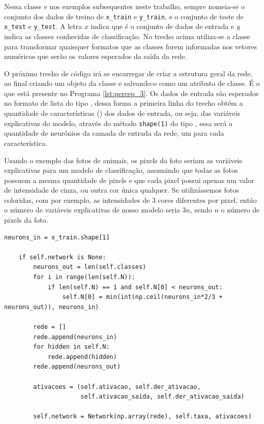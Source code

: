 Nessa classe e nos exemplos subsequentes neste trabalho, sempre nomeia-se o conjunto dos dados de treino de \texttt{x\_train} e \texttt{y\_train}, e o conjunto de teste de \texttt{x\_test} e \texttt{y\_test}. A letra $x$ indica que é o conjunto de dados de entrada e $y$ indica as classes conhecidas de classificação. No trecho acima utiliza-se a classe  para transformar quaisquer formatos que as classes forem informadas nos vetores numéricos que serão os valores esperados da saída da rede.

O próximo trecho de código irá se encarregar de criar a estrutura geral da rede, ao final criando um objeto da classe  e salvando-o como um atributo de classe. É o que está presente no Programa \ref{lst:percep_3}. Os dados de entrada são esperados no formato de lista do tipo , dessa forma a primeira linha do trecho obtém a quantidade de características () dos dados de entrada, ou seja, das variáveis explicativas do modelo, através do método \texttt{shape(1)} do tipo , essa será a quantidade de neurônios da camada de entrada da rede, um para cada característica.

Usando o exemplo das fotos de animais, os pixels da foto seriam as variáveis explicativas para um modelo de classificação, assumindo que todas as fotos possuem a mesma quantidade de pixels e que cada pixel possui apenas um valor de intensidade de cinza, ou outra cor única qualquer. Se utilizássemos fotos coloridas, com por exemplo, as intensidades de $3$ cores diferentes por pixel, então o número de variáveis explicativas de nosso modelo seria $3n$, sendo $n$ o número de pixels da foto.
\newline
\estiloR
\begin{lstlisting}[caption={Trecho da classe \eng{Perceptron}}, label={lst:percep_3}, escapeinside={\%}]
	neurons_in = x_train.shape[1]

	if self.network is None:
	    neurons_out = len(self.classes)
	    for i in range(len(self.N)):
	        if len(self.N) == 1 and self.N[0] < neurons_out:
	            self.N[0] = min(int(np.ceil(neurons_in*2/3 + neurons_out)), neurons_in)
	    
	    rede = []
	    rede.append(neurons_in)
	    for hidden in self.N:
	        rede.append(hidden)
	    rede.append(neurons_out)
	    
	    ativacoes = (self.ativacao, self.der_ativacao, 
	                 self.ativacao_saida, self.der_ativacao_saida)

	    self.network = Network(np.array(rede), self.taxa, ativacoes)
\end{lstlisting}


